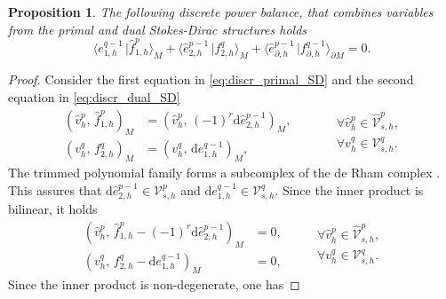 \documentclass{elsarticle}
\newcommand{\revOne}[1]{{\color{black}#1}}
\newtheorem{proposition}{Proposition}
\renewcommand\d{\ensuremath{\mathrm{d}}}
\newcommand*{\dual}[1]{\ensuremath{\widehat{#1}}}
\newcommand{\inpr}[3][]{\ensuremath{( #2, \, #3 )_{#1}}}
\newcommand{\dualpr}[3][]{\ensuremath{\langle #2 \, \vert #3 \rangle_{#1}}}
\begin{document}
{\begin{proposition}\label{pr:discr_powbal}
The following discrete power balance, that combines variables from the primal and dual Stokes-Dirac structures holds
\begin{equation}\label{eq:discr_powbal}
    \dualpr[M]{e^{q-1}_{1, h}}{\dual{f}^p_{1, h}} + \dualpr[M]{\dual{e}^{p-1}_{2, h}}{f^q_{2, h}} + \dualpr[\partial M]{\dual{e}_{\partial, h}^{p-1}}{f_{\partial, h}^{q-1}} = 0.
\end{equation}
\end{proposition}

\begin{proof}
Consider the first equation in \eqref{eq:discr_primal_SD} and the second equation in \eqref{eq:discr_dual_SD}
\begin{equation}
    \begin{aligned}
    \inpr[M]{\dual{v}^p_h}{\dual{f}^p_{1, h}} &= \inpr[M]{\dual{v}^p_h}{(-1)^r\d \dual{e}^{p-1}_{2, h}}, \\
        \inpr[M]{v^q_h}{f^q_{2, h}} &= \inpr[M]{v^q_h}{\d e^{q-1}_{1, h}},
    \end{aligned} \qquad
    \begin{aligned}
    &\forall \dual{v}^{p}_h \in \dual{\mathcal{V}}_{s, h}^p, \\
    &\forall v^q_h \in \mathcal{V}_{s, h}^q. \\
    \end{aligned}
\end{equation}
\revOne{The trimmed polynomial family forms a subcomplex of the de Rham complex \cite[Lemma 3.8]{arnold2006acta}. This assures that $\d \dual{e}_{2, h}^{p-1} \in \mathcal{V}_{s, h}^p$ and $\d e^{q-1}_{1, h} \in \mathcal{V}_{s, h}^q$.} Since the inner product is bilinear, it holds
\begin{equation}
\begin{aligned}
    \inpr[M]{\dual{v}^p_h}{\dual{f}^p_{1, h} - (-1)^r\d \dual{e}^{p-1}_{2, h}} &= 0, \\
    \inpr[M]{v^q_h}{f^q_{2, h} - \d e^{q-1}_{1, h}} &= 0, 
\end{aligned} \qquad
    \begin{aligned}
    \forall \dual{v}^p_h \in \dual{\mathcal{V}}_{s, h}^p, \\
    \forall v^q_h \in \mathcal{V}_{s, h}^q. \\
    \end{aligned}
\end{equation}
Since the inner product is non-degenerate, one has 

\end{proof}}
\end{document}
